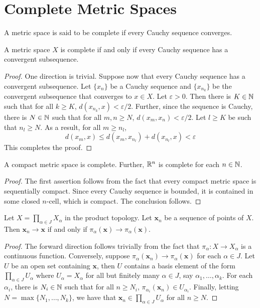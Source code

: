 \section{Complete Metric Spaces}

\begin{definition}[Completeness]
    A metric space is said to be complete if every Cauchy sequence converges.
\end{definition}

\begin{lemma}
    A metric space $X$ is complete if and only if every Cauchy sequence has a convergent subsequence.
\end{lemma}
\begin{proof}
    One direction is trivial. Suppose now that every Cauchy sequence has a convergent subsequence. Let $\{x_n\}$ be a Cauchy sequence and $\{x_{n_k}\}$ be the convergent subsequence that converges to $x\in X$. Let $\varepsilon > 0$. Then there is $K\in\mathbb{N}$ such that for all $k\ge K$, $d(x_{n_k}, x) < \varepsilon/2$. Further, since the sequence is Cauchy, there is $N\in\mathbb{N}$ such that for all $m,n\ge N$, $d(x_m,x_n) < \varepsilon/2$. Let $l\ge K$ be such that $n_l\ge N$. As a result, for all $m\ge n_l$, 
    \begin{equation*}
        d(x_m, x)\le d(x_m, x_{n_l}) + d(x_{n_l}, x) < \varepsilon
    \end{equation*}
    This completes the proof.
\end{proof}

\begin{corollary}
    A compact metric space is complete. Further, $\mathbb{R}^n$ is complete for each $n\in\mathbb{N}$.
\end{corollary}
\begin{proof}
    The first assertion follows from the fact that every compact metric space is sequentially compact. Since every Cauchy sequence is bounded, it is contained in some closed $n$-cell, which is compact. The conclusion follows.
\end{proof}

\begin{lemma}
    Let $X = \prod_{\alpha\in J} X_\alpha$ in the product topology. Let $\mathbf x_n$ be a sequence of points of $X$. Then $\mathbf x_n\to\mathbf x$ if and only if $\pi_{\alpha}(\mathbf x)\to\pi_\alpha(\mathbf x)$.
\end{lemma}
\begin{proof}
    The forward direction follows trivially from the fact that $\pi_\alpha: X\to X_\alpha$ is a continuous function. Conversely, suppose $\pi_\alpha(\mathbf x_n)\to\pi_\alpha(\mathbf x)$ for each $\alpha\in J$. Let $U$ be an open set containing $\mathbf x$, then $U$ contains a basis element of the form $\prod_{\alpha\in J} U_\alpha$ where $U_\alpha = X_\alpha$ for all but finitely many $\alpha\in J$, say $\alpha_1,\ldots,\alpha_k$. For each $\alpha_i$, there is $N_i\in\mathbb{N}$ such that for all $n\ge N_i$, $\pi_{\alpha_i}(\mathbf x_n)\in U_{\alpha_i}$. Finally, letting $N = \max\{N_1,\ldots,N_k\}$, we have that $\mathbf x_n\in\prod_{\alpha\in J}U_\alpha$ for all $n\ge N$.
\end{proof}

